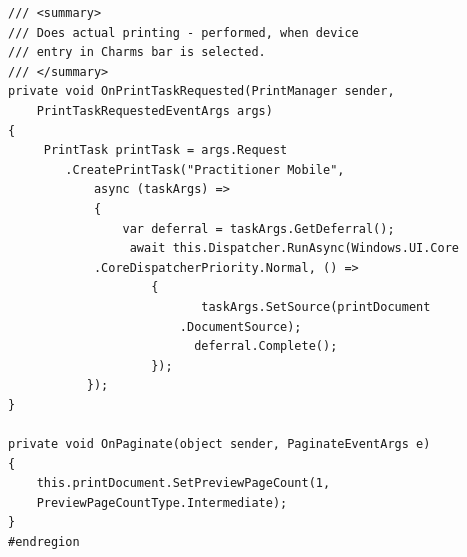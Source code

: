 \documentclass[a4paper,bibtotoc,oneside]{scrbook}
\begin{document}
\begin{appendix}
\begin{lstlisting}[caption={Ausschnitt aus MainPage.xaml.cs},captionpos=t]
/// <summary>
/// Does actual printing - performed, when device
/// entry in Charms bar is selected.
/// </summary>
private void OnPrintTaskRequested(PrintManager sender,
	PrintTaskRequestedEventArgs args)
{
     PrintTask printTask = args.Request
		.CreatePrintTask("Practitioner Mobile",
           	async (taskArgs) =>
           	{
               	var deferral = taskArgs.GetDeferral();
              	 await this.Dispatcher.RunAsync(Windows.UI.Core
			.CoreDispatcherPriority.Normal, () =>
                   	{
                    	   taskArgs.SetSource(printDocument
						.DocumentSource);
                     	  deferral.Complete();
                   	});
           });
}

private void OnPaginate(object sender, PaginateEventArgs e)
{
    this.printDocument.SetPreviewPageCount(1, 
	PreviewPageCountType.Intermediate);
}
#endregion
\end{lstlisting}

\end{appendix}
\end{document}
